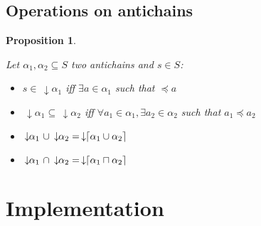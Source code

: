 \documentclass[letterpaper]{article}
\DeclarePairedDelimiter{\ceil}{\lceil}{\rceil}
\newcommand{\darrow}{\, \downarrow \!\!}
\newtheorem{proposition}{Proposition}
\begin{document}
\subsection{Operations on antichains}




\begin{proposition}

\label{antichains_ops}

Let $\alpha_1, \alpha_2 \subseteq S$ two antichains and $s \in S$:

\begin{itemize}
    \item $s \in \darrow \alpha_1$
    iff $\exists a \in \alpha_1$ such that $\preceq a$
    \item $\darrow \alpha_1 \subseteq \darrow \alpha_2$
    iff $\forall a_1 \in \alpha_1,
    \exists a_2 \in \alpha_2$ such that $a_1 \preceq a_2$
    \item $ \darrow \alpha_1 \ \cup \darrow \alpha_2 =
    \darrow \ceil{\alpha_1 \cup \alpha_2}$
    \item $\darrow \alpha_1 \ \cap \darrow \alpha_2 =
    \darrow \ceil{\alpha_1 \sqcap \alpha_2}$


\end{itemize}

\end{proposition}



%
%

\section{Implementation}

\paragraph{}
\end{document}
